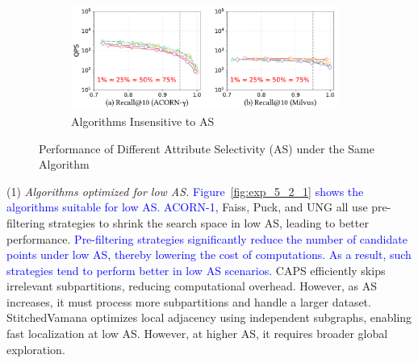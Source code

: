 \documentclass[sigconf, nonacm]{acmart}
\begin{document}
{\begin{figure}
\begin{subfigure}{0.34\textwidth}
			\includegraphics[width=0.96\textwidth]{figures/exp/exp_5_2_3.pdf}
			\caption{Algorithms Insensitive to AS}
			\label{fig:exp_5_2_3}
		\end{subfigure}
		
		\setlength{\abovecaptionskip}{0.1cm}
		\setlength{\belowcaptionskip}{-0.15cm}
		
		\caption{Performance of Different Attribute Selectivity (AS) under the Same Algorithm}
		\label{fig:exp_5_2_combined}
	\end{figure}
	
	
	
	
	(1) \textit{Algorithms optimized for low AS.}  
	\textcolor{blue}{Figure~\ref{fig:exp_5_2_1} shows the algorithms suitable for low AS.}
	\textcolor{blue}{ACORN-1}, Faiss, Puck, and UNG all use pre-filtering strategies to shrink the search space in low AS, leading to better performance. \textcolor{blue}{Pre-filtering strategies significantly reduce the number of candidate points under low AS, thereby lowering the cost of  computations. As a result, such strategies tend to perform better in low AS scenarios.} CAPS efficiently skips irrelevant subpartitions, reducing computational overhead. However, as AS increases, it must process more subpartitions and handle a larger dataset. StitchedVamana optimizes local adjacency using independent subgraphs, enabling fast localization at low AS. However, at higher AS, it requires broader global exploration. 
	
	
	
}
\end{document}

